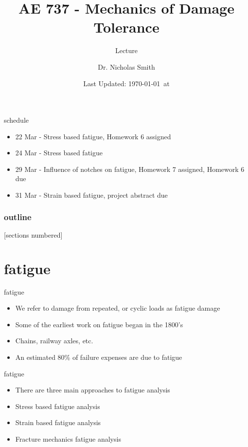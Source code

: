 \documentclass[10pt]{beamer}
\title{AE 737 - Mechanics of Damage Tolerance}
\subtitle{Lecture \arabic{lecture}}
\date{Last Updated: \today\ at \DTMcurrenttime}
\author{Dr. Nicholas Smith}
\institute{Wichita State University, Department of Aerospace Engineering}
\begin{document}
\maketitle
\begin{frame}{schedule}
	\begin{itemize}
		\item 22 Mar - Stress based fatigue, Homework 6 assigned
		\item 24 Mar - Stress based fatigue
		\item 29 Mar - Influence of notches on fatigue, Homework 7 assigned, Homework 6 due
		\item 31 Mar - Strain based fatigue, project abstract due
	\end{itemize}
\end{frame}

\begin{frame}
  \frametitle{outline}
  [sections numbered]
  \tableofcontents[hideallsubsections]
\end{frame}

\section{fatigue}

\begin{frame}{fatigue}
	\begin{itemize}
		\item We refer to damage from repeated, or cyclic loads as fatigue damage
		\item Some of the earliest work on fatigue began in the 1800's
		\item Chains, railway axles, etc.
		\item An estimated 80\% of failure expenses are due to fatigue
	\end{itemize}
\end{frame}

\begin{frame}{fatigue}
	\begin{itemize}[<+->]
		\item There are three main approaches to fatigue analysis
		\item Stress based fatigue analysis
		\item Strain based fatigue analysis
		\item Fracture mechanics fatigue analysis
	\end{itemize}
\end{frame}
\end{document}
